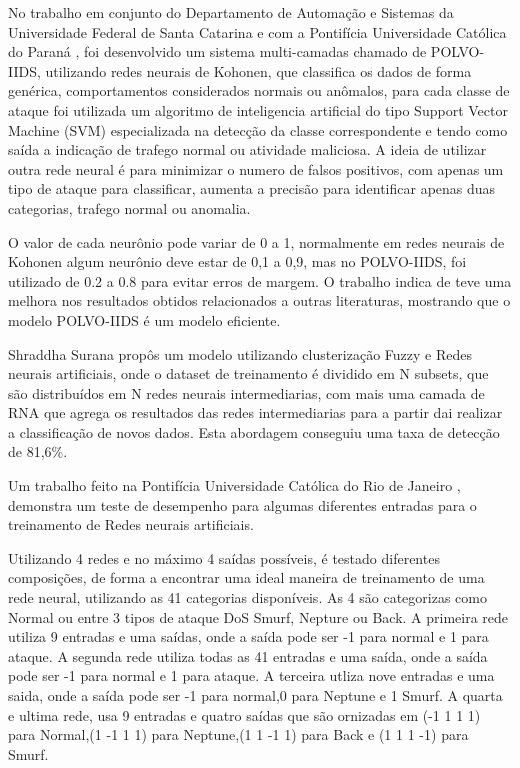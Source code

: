 \documentclass[
	12pt,				%
	openright,			%
	oneside,
	a4paper,			%
	english,			%
	french,				%
	spanish,			%
	brazil				%
	]{abntex2}
\begin{document}
No trabalho em conjunto do Departamento de Automação e Sistemas da Universidade Federal de Santa Catarina \cite{polvo1} e com a Pontifícia Universidade Católica do Paraná \cite{polvo2}, foi desenvolvido um sistema multi-camadas chamado de POLVO-IIDS, utilizando redes neurais de Kohonen, que classifica os dados de forma genérica, comportamentos considerados normais ou anômalos, para cada classe de ataque foi utilizada um algoritmo de inteligencia artificial do tipo Support Vector Machine (SVM) especializada na detecção da classe correspondente e tendo como saída a indicação de trafego normal ou atividade maliciosa.
A ideia de utilizar outra rede neural é para minimizar o numero de falsos positivos, com apenas um tipo de ataque para classificar, aumenta a precisão para identificar apenas duas categorias, trafego normal ou anomalia.

O valor de cada neurônio pode variar de 0 a 1, normalmente em redes neurais de Kohonen algum neurônio deve estar de 0,1 a 0,9, mas no POLVO-IIDS, foi utilizado de 0.2 a 0.8 para evitar erros de margem. 
O trabalho indica de teve uma melhora nos resultados obtidos relacionados a outras literaturas, mostrando que o modelo POLVO-IIDS é um modelo eficiente.

Shraddha Surana propôs um modelo \cite{Surana} utilizando clusterização Fuzzy e Redes neurais artificiais, onde o dataset de treinamento é dividido em N subsets, que são distribuídos em N redes neurais intermediarias, com mais uma camada de RNA que agrega os resultados das redes intermediarias para a partir dai realizar a classificação de novos dados. Esta abordagem conseguiu uma taxa de detecção de 81,6\%.



Um trabalho feito na Pontifícia Universidade Católica do Rio de Janeiro \cite{RenatoMaia}, demonstra um teste de desempenho para algumas diferentes entradas para o treinamento de Redes neurais artificiais.

Utilizando 4 redes e no máximo 4 saídas possíveis, é testado diferentes composições, de forma a encontrar uma ideal maneira de treinamento de uma rede neural, utilizando as 41 categorias disponíveis.
As 4 são categorizas como Normal ou entre 3 tipos de ataque DoS Smurf, Nepture ou Back.
A primeira rede utiliza 9 entradas e uma saídas, onde a saída pode ser -1 para normal e 1 para ataque.
A segunda rede utiliza todas as 41 entradas e uma saída, onde a saída pode ser -1 para normal e 1 para ataque.
A terceira utliza nove entradas e uma saida, onde a saída pode ser -1 para normal,0 para Neptune e 1 Smurf.
A quarta e ultima rede, usa 9 entradas e quatro saídas que são ornizadas em (-1 1 1 1) para Normal,(1 -1 1 1) para Neptune,(1 1 -1 1) para Back e (1 1 1 -1) para Smurf.
\end{document}
